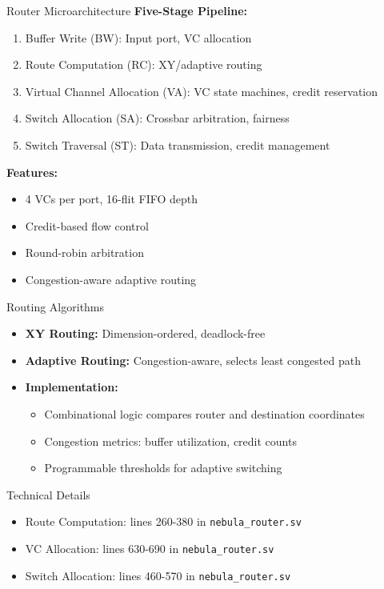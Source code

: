 \documentclass{beamer}
\begin{document}
\begin{frame}{Router Microarchitecture}
  \textbf{Five-Stage Pipeline:}
  \begin{enumerate}
    \item Buffer Write (BW): Input port, VC allocation
    \item Route Computation (RC): XY/adaptive routing
    \item Virtual Channel Allocation (VA): VC state machines, credit reservation
    \item Switch Allocation (SA): Crossbar arbitration, fairness
    \item Switch Traversal (ST): Data transmission, credit management
  \end{enumerate}
  \vspace{0.5em}
  \textbf{Features:}
  \begin{itemize}
    \item 4 VCs per port, 16-flit FIFO depth
    \item Credit-based flow control
    \item Round-robin arbitration
    \item Congestion-aware adaptive routing
  \end{itemize}
\end{frame}

\begin{frame}{Routing Algorithms}
  \begin{itemize}
    \item \textbf{XY Routing:} Dimension-ordered, deadlock-free
    \item \textbf{Adaptive Routing:} Congestion-aware, selects least congested path
    \item \textbf{Implementation:}
      \begin{itemize}
        \item Combinational logic compares router and destination coordinates
        \item Congestion metrics: buffer utilization, credit counts
        \item Programmable thresholds for adaptive switching
      \end{itemize}
  \end{itemize}
  \begin{block}{Technical Details}
    \begin{itemize}
      \item Route Computation: lines 260-380 in \texttt{nebula\_router.sv}
      \item VC Allocation: lines 630-690 in \texttt{nebula\_router.sv}
      \item Switch Allocation: lines 460-570 in \texttt{nebula\_router.sv}
    \end{itemize}
  \end{block}
\end{frame}
\end{document}
